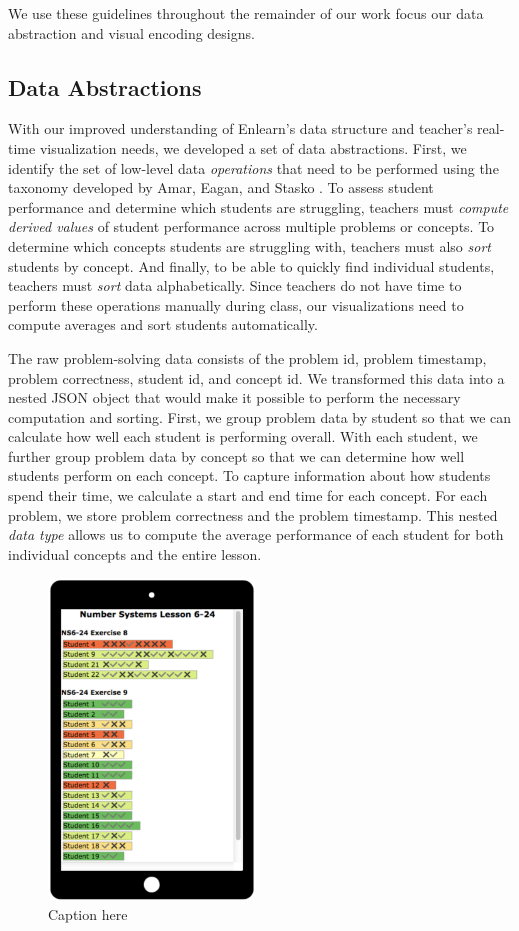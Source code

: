 \documentclass{sigchi}
\begin{document}
We use these guidelines throughout the remainder of our work focus our data abstraction and visual encoding designs.



\subsection{Data Abstractions}
With our improved understanding of Enlearn's data structure and teacher's real-time visualization needs, we developed a set of data abstractions. First, we identify the set of low-level data \emph{operations} that need to be performed using the taxonomy developed by Amar, Eagan, and Stasko \cite{Amar05}. To assess student performance and determine which students are struggling, teachers must \emph{compute derived values} of student performance across multiple problems or concepts. To determine which concepts students are struggling with, teachers must also \emph{sort} students by concept. And finally, to be able to quickly find individual students, teachers must \emph{sort} data alphabetically. Since teachers do not have time to perform these operations manually during class, our visualizations need to compute averages and sort students automatically.

The raw problem-solving data consists of the problem id, problem timestamp, problem correctness, student id, and concept id. We transformed this data into a nested JSON object that would make it possible to perform the necessary computation and sorting. First, we group problem data by student so that we can calculate how well each student is performing overall. With each student, we further group problem data by concept so that we can determine how well students perform on each concept. To capture information about how students spend their time, we calculate a start and end time for each concept. For each problem, we store problem correctness and the problem timestamp. This nested \emph{data type} allows us to compute the average performance of each student for both individual concepts and the entire lesson.



\begin{figure}[t]
\centering
\includegraphics[width=55mm]{images/ConceptVisualization.pdf}
\caption{Caption here}
\label{fig:ConceptVisualization}
\end{figure}
\end{document}
